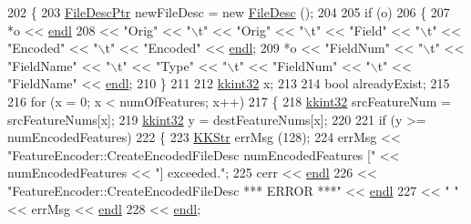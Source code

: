\begin{DoxyCode}
202 \{
203   \hyperlink{class_k_k_m_l_l_1_1_file_desc}{FileDescPtr}  newFileDesc = \textcolor{keyword}{new} \hyperlink{class_k_k_m_l_l_1_1_file_desc}{FileDesc} ();
204 
205   \textcolor{keywordflow}{if}  (o)
206   \{
207     *o << \hyperlink{namespace_k_k_b_ad1f50f65af6adc8fa9e6f62d007818a8}{endl} 
208        << \textcolor{stringliteral}{"Orig"}     << \textcolor{stringliteral}{"\(\backslash\)t"} << \textcolor{stringliteral}{"Orig"}      << \textcolor{stringliteral}{"\(\backslash\)t"} << \textcolor{stringliteral}{"Field"} << \textcolor{stringliteral}{"\(\backslash\)t"} << \textcolor{stringliteral}{"Encoded"}  << \textcolor{stringliteral}{"\(\backslash\)t"} << \textcolor{stringliteral}{"Encoded"}  
       << \hyperlink{namespace_k_k_b_ad1f50f65af6adc8fa9e6f62d007818a8}{endl};
209     *o << \textcolor{stringliteral}{"FieldNum"} << \textcolor{stringliteral}{"\(\backslash\)t"} << \textcolor{stringliteral}{"FieldName"} << \textcolor{stringliteral}{"\(\backslash\)t"} << \textcolor{stringliteral}{"Type"}  << \textcolor{stringliteral}{"\(\backslash\)t"} << \textcolor{stringliteral}{"FieldNum"} << \textcolor{stringliteral}{"\(\backslash\)t"} << \textcolor{stringliteral}{"FieldName"}
       << \hyperlink{namespace_k_k_b_ad1f50f65af6adc8fa9e6f62d007818a8}{endl};
210   \}
211 
212   \hyperlink{namespace_k_k_b_a8fa4952cc84fda1de4bec1fbdd8d5b1b}{kkint32}  x;
213 
214   \textcolor{keywordtype}{bool}  alreadyExist;
215   
216   \textcolor{keywordflow}{for}  (x = 0;  x < numOfFeatures; x++)
217   \{
218     \hyperlink{namespace_k_k_b_a8fa4952cc84fda1de4bec1fbdd8d5b1b}{kkint32}  srcFeatureNum = srcFeatureNums[x];
219     \hyperlink{namespace_k_k_b_a8fa4952cc84fda1de4bec1fbdd8d5b1b}{kkint32}  y = destFeatureNums[x];
220 
221     \textcolor{keywordflow}{if}  (y >= numEncodedFeatures)
222     \{
223       \hyperlink{class_k_k_b_1_1_k_k_str}{KKStr}  errMsg (128);
224       errMsg << \textcolor{stringliteral}{"FeatureEncoder::CreateEncodedFileDesc  numEncodedFeatures ["} << numEncodedFeatures << \textcolor{stringliteral}{"] 
       exceeded."};
225       cerr << \hyperlink{namespace_k_k_b_ad1f50f65af6adc8fa9e6f62d007818a8}{endl}
226            << \textcolor{stringliteral}{"FeatureEncoder::CreateEncodedFileDesc     *** ERROR ***"}           << 
      \hyperlink{namespace_k_k_b_ad1f50f65af6adc8fa9e6f62d007818a8}{endl}
227            << \textcolor{stringliteral}{"             "} << errMsg << \hyperlink{namespace_k_k_b_ad1f50f65af6adc8fa9e6f62d007818a8}{endl}
228            << \hyperlink{namespace_k_k_b_ad1f50f65af6adc8fa9e6f62d007818a8}{endl};

\end{DoxyCode}
